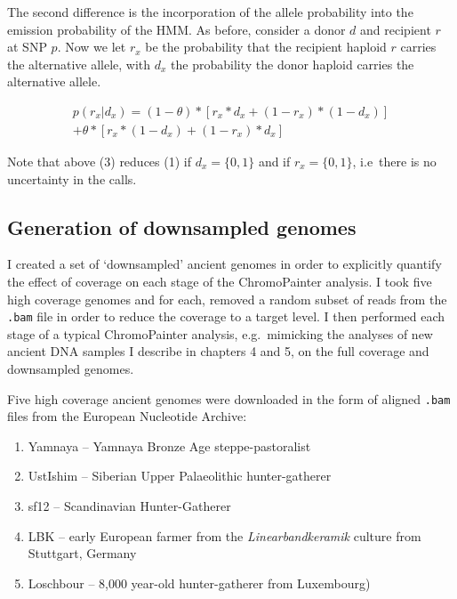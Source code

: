The second difference is the incorporation of the allele probability into the emission probability of the HMM. As before, consider a donor $d$ and recipient $r$ at SNP $p$. Now we let $r_x$ be the probability that the recipient haploid $r$ carries the alternative allele, with $d_x$ the probability the donor haploid carries the alternative allele.

\begin{equation}
\begin{split}
p(r_{x} | d_{x}) = (1-\theta)*[r_{x}*d_{x} + (1-r_{x}) * (1-d_{x})] \\ + \theta * [r_{x}*(1-d_{x}) + (1-r_{x})*d_{x}]
\end{split}
\end{equation}

Note that above (3) reduces (1) if $d_{x} = \{0,1\}$ and if $r_{x} = \{0,1\}$, i.e\ there is no uncertainty in the calls.


\subsection{Generation of downsampled genomes}

I created a set of `downsampled' ancient genomes in order to explicitly quantify the effect of coverage on each stage of the ChromoPainter analysis. I took five high coverage genomes and for each, removed a random subset of reads from the \texttt{.bam} file in order to reduce the coverage to a target level. I then performed each stage of a typical ChromoPainter analysis, e.g.\ mimicking the analyses of new ancient DNA samples I describe in chapters 4 and 5, on the full coverage and downsampled genomes.

Five high coverage ancient genomes were downloaded in the form of aligned \texttt{.bam} files from the European Nucleotide Archive:

\begin{enumerate}
\item Yamnaya -- Yamnaya Bronze Age steppe-pastoralist \cite{deBarrosDamgaardeaar7711}
\item UstIshim -- Siberian Upper Palaeolithic hunter-gatherer \cite{Fu2014}
\item sf12 -- Scandinavian Hunter-Gatherer \cite{Gunther2018a}
\item LBK -- early European farmer from the \textit{Linearbandkeramik} culture from Stuttgart, Germany \cite{Lazaridis2014}
\item Loschbour -- 8,000 year-old hunter-gatherer from Luxembourg) \cite{Lazaridis2014}
\end{enumerate}

